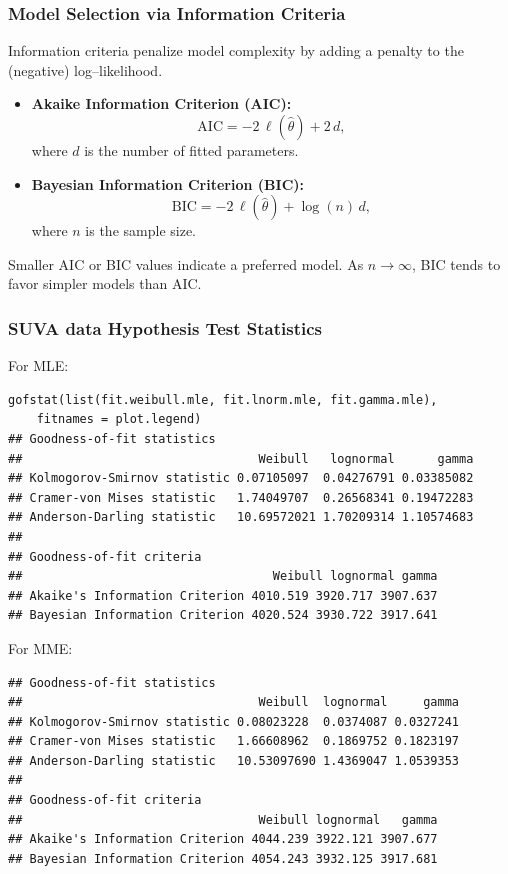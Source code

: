 \documentclass[11pt]{article}
\newcommand{\noi}{\noindent}
\begin{document}
\subsubsection{Model Selection via Information Criteria}

Information criteria penalize model complexity by adding a penalty to the (negative) log–likelihood.

\begin{itemize}
  \item \textbf{Akaike Information Criterion (AIC):}
    \[
      \mathrm{AIC} = -2\,\ell(\widehat\theta) + 2\,d,
    \]
    where \(d\) is the number of fitted parameters.
  \item \textbf{Bayesian Information Criterion (BIC):}
    \[
      \mathrm{BIC} = -2\,\ell(\widehat\theta) + \log(n)\,d,
    \]
    where \(n\) is the sample size.
\end{itemize} \phantom{i}

\noi Smaller AIC or BIC values indicate a preferred model.  As \(n\to\infty\), BIC tends to favor simpler models than AIC.  

\subsubsection{SUVA data Hypothesis Test Statistics}
\noi For MLE:
\begin{lstlisting}
gofstat(list(fit.weibull.mle, fit.lnorm.mle, fit.gamma.mle),
    fitnames = plot.legend)
## Goodness-of-fit statistics
##                                 Weibull   lognormal      gamma
## Kolmogorov-Smirnov statistic 0.07105097  0.04276791 0.03385082
## Cramer-von Mises statistic   1.74049707  0.26568341 0.19472283
## Anderson-Darling statistic   10.69572021 1.70209314 1.10574683
##
## Goodness-of-fit criteria
##                                   Weibull lognormal gamma
## Akaike's Information Criterion 4010.519 3920.717 3907.637
## Bayesian Information Criterion 4020.524 3930.722 3917.641
\end{lstlisting}

\noi For MME:
\begin{lstlisting}
## Goodness-of-fit statistics
##                                 Weibull  lognormal     gamma
## Kolmogorov-Smirnov statistic 0.08023228  0.0374087 0.0327241
## Cramer-von Mises statistic   1.66608962  0.1869752 0.1823197
## Anderson-Darling statistic   10.53097690 1.4369047 1.0539353
##
## Goodness-of-fit criteria
##                                 Weibull lognormal   gamma
## Akaike's Information Criterion 4044.239 3922.121 3907.677
## Bayesian Information Criterion 4054.243 3932.125 3917.681
\end{lstlisting}
\end{document}

